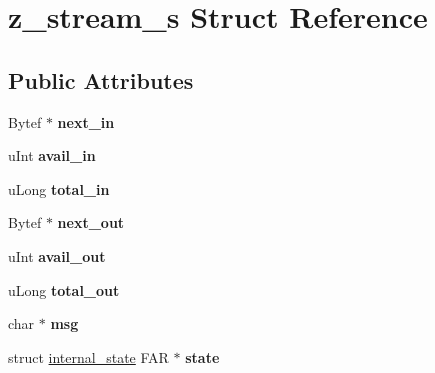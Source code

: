 \hypertarget{structz__stream__s}{}\section{z\+\_\+stream\+\_\+s Struct Reference}
\label{structz__stream__s}
\subsection*{Public Attributes}
\begin{DoxyCompactItemize}
\item 
Bytef $\ast$ {\bfseries next\+\_\+in}\hypertarget{structz__stream__s_a21d2c026f0f2fcd67f33011231f8ed00}{}\label{structz__stream__s_a21d2c026f0f2fcd67f33011231f8ed00}

\item 
u\+Int {\bfseries avail\+\_\+in}\hypertarget{structz__stream__s_a0cf177f50dbb49692f27480cbcfde794}{}\label{structz__stream__s_a0cf177f50dbb49692f27480cbcfde794}

\item 
u\+Long {\bfseries total\+\_\+in}\hypertarget{structz__stream__s_aa8f408b9632737dc21519fa1ed34b08d}{}\label{structz__stream__s_aa8f408b9632737dc21519fa1ed34b08d}

\item 
Bytef $\ast$ {\bfseries next\+\_\+out}\hypertarget{structz__stream__s_aed4a02cfe93e975314fed50b04427bf3}{}\label{structz__stream__s_aed4a02cfe93e975314fed50b04427bf3}

\item 
u\+Int {\bfseries avail\+\_\+out}\hypertarget{structz__stream__s_a45ad2364307af9d944fd39d4eca3ca3c}{}\label{structz__stream__s_a45ad2364307af9d944fd39d4eca3ca3c}

\item 
u\+Long {\bfseries total\+\_\+out}\hypertarget{structz__stream__s_abae26f1f236cf920250b9d37fdf009c1}{}\label{structz__stream__s_abae26f1f236cf920250b9d37fdf009c1}

\item 
char $\ast$ {\bfseries msg}\hypertarget{structz__stream__s_a9b2f745fc780e3b33e2935f8c650a326}{}\label{structz__stream__s_a9b2f745fc780e3b33e2935f8c650a326}

\item 
struct \hyperlink{structinternal__state}{internal\+\_\+state} F\+AR $\ast$ {\bfseries state}\hypertarget{structz__stream__s_ac4a114217a1868dc6fbe7d1f5bda126b}{}\label{structz__stream__s_ac4a114217a1868dc6fbe7d1f5bda126b}


\end{DoxyCompactItemize}
